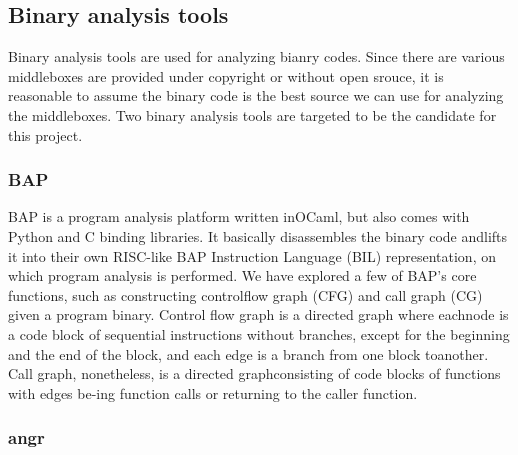 \subsection{Binary analysis tools}
Binary analysis tools are used for analyzing bianry codes.
Since there are various middleboxes are provided under copyright or without open srouce, it is reasonable to assume the binary code is the best source we can use for analyzing the middleboxes.
Two binary analysis tools are targeted to be the candidate for this project.

\subsubsection{BAP}
BAP is a program analysis platform written inOCaml, but also comes with Python and C binding libraries.
It basically disassembles the binary code andlifts it into their own RISC-like BAP Instruction Language (BIL) representation, on which program analysis is performed.
We have explored a few of BAP’s core functions, such as constructing controlflow graph (CFG) and call graph (CG) given a program binary.
Control flow graph is a directed graph where eachnode is a code block of sequential instructions without branches, except for the beginning and the end of the block, and each edge is a branch from one block toanother.
Call graph,  nonetheless,  is a directed graphconsisting of code blocks of functions with edges be-ing function calls or returning to the caller function.

\subsubsection{angr}


